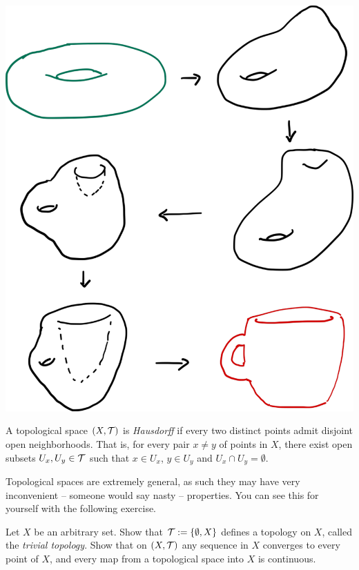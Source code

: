 \begin{marginfigure}
  \includegraphics{images/1_1-dount-to-cup.pdf}
  \vspace{5pt}
\end{marginfigure}

\begin{definition}
  A topological space $(X, \mathcal{T})$ is \emph{Hausdorff} if every two distinct points admit disjoint open neighborhoods. That is, for every pair $x\neq y$ of points in $X$, there exist open subsets $U_x, U_y\in\mathcal{T}$ such that $x\in U_x$, $y\in U_y$ and $U_x \cap U_y = \emptyset$.
\end{definition}

Topological spaces are extremely general, as such they may have very inconvenient -- someone would say nasty -- properties.
You can see this for yourself with the following exercise.

\begin{exercise}
Let $X$ be an arbitrary set. Show that $\mathcal{T}:=\{\emptyset, X\}$ defines a topology on $X$, called the \emph{trivial topology}. Show that on $(X, \mathcal{T})$ any sequence in $X$ converges to every point of $X$, and every map from a topological space into $X$ is continuous.
\end{exercise}

